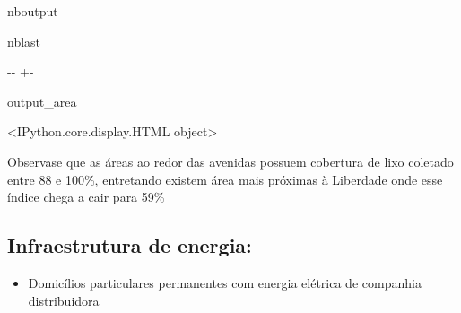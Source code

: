 \documentclass[letterpaper,10pt,brazil]{sphinxmanual}
\newlength\nbsphinxcodecellspacing
\begin{document}
\begin{sphinxuseclass}{nboutput}
\begin{sphinxuseclass}{nblast}
{

\kern-\sphinxverbatimsmallskipamount\kern-\baselineskip
\kern+\FrameHeightAdjust\kern-\fboxrule
\vspace{\nbsphinxcodecellspacing}

\begin{sphinxuseclass}{output_area}
\begin{sphinxuseclass}{}


\begin{sphinxVerbatim}[commandchars=\\\{\}]
\llap{\color{nbsphinxout}[14]:\,\hspace{\fboxrule}\hspace{\fboxsep}}<IPython.core.display.HTML object>
\end{sphinxVerbatim}



\end{sphinxuseclass}
\end{sphinxuseclass}
}

\end{sphinxuseclass}
\end{sphinxuseclass}
\sphinxAtStartPar
Observa\sphinxhyphen{}se que as áreas ao redor das avenidas possuem cobertura de lixo coletado entre 88 e 100\%, entretando existem área mais próximas à Liberdade onde esse índice chega a cair para 59\%


\subsection{Infraestrutura de energia:}
\label{\detokenize{exemplos/analise_domicilios:Infraestrutura-de-energia:}}\begin{itemize}
\item {} 
 Domicílios particulares permanentes com energia elétrica de companhia distribuidora

\end{itemize}
\end{document}
